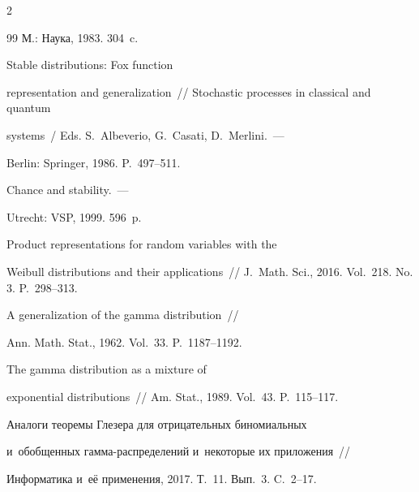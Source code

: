 \begin{multicols}{2}
{{\begin{thebibliography}{99}
М.: Наука, 1983. 304~c. 









 Stable distributions: Fox function


representation and generalization~//  Stochastic processes in classical and quantum


systems~/ Eds. S.~Albeverio, G.~Casati, D.~Merlini.~--- 


Berlin: Springer, 1986. P.~497--511.







 Chance and stability.~--- 


Utrecht: VSP, 1999. 596~p.







 Product representations for random variables with the


 Weibull distributions and their applications~// J.~Math. Sci., 2016. Vol.~218. No.\,3. P.~298--313.







 A generalization of the gamma distribution~//


Ann. Math. Stat., 1962. Vol.~33. P.~1187--1192.







 The gamma distribution as a mixture of


exponential distributions~// Am. Stat., 1989. Vol.~43. P.~115--117.







 Аналоги теоремы Глезера для отрицательных биномиальных 


и~обобщенных гам\-ма-рас\-пре\-де\-ле\-ний и~некоторые их приложения~// 


Информатика и~её применения, 2017. Т.~11. Вып.~3. C.~2--17.






\end{thebibliography}}}
\end{multicols}
